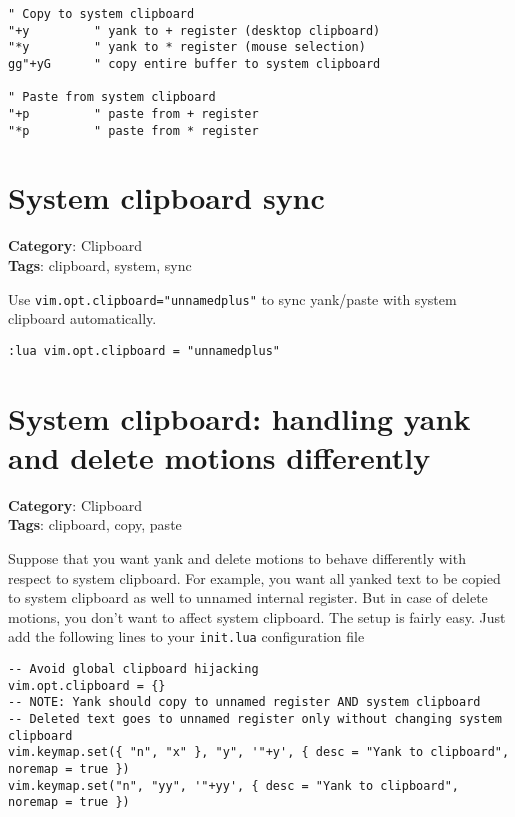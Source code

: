 {{{{\begin{Exa*}{}
\begin{Verbatim}[fontsize=\footnotesize, breaklines, breakanywhere]
" Copy to system clipboard
"+y         " yank to + register (desktop clipboard)
"*y         " yank to * register (mouse selection)
gg"+yG      " copy entire buffer to system clipboard

" Paste from system clipboard
"+p         " paste from + register
"*p         " paste from * register
\end{Verbatim}
\end{Exa*}

\section{System clipboard sync}

\textbf{Category}: Clipboard\\ \textbf{Tags}: clipboard, system, sync
\vspace{0.5cm}

Use {\footnotesize \Verb§vim.opt.clipboard="unnamedplus"§} to sync yank/paste with system clipboard automatically.

\begin{Exa*}{}
\begin{Verbatim}[fontsize=\footnotesize, breaklines, breakanywhere]
:lua vim.opt.clipboard = "unnamedplus"
\end{Verbatim}
\end{Exa*}

\section{System clipboard: handling yank and delete motions differently}

\textbf{Category}: Clipboard\\ \textbf{Tags}: clipboard, copy, paste
\vspace{0.5cm}

Suppose that you want yank and delete motions to behave differently with respect to system clipboard. For example, you want all yanked text to be copied to system clipboard as well to unnamed internal register. But in case of delete motions, you don't want to affect system clipboard. The setup is fairly easy. Just add the following lines to your {\footnotesize \Verb§init.lua§} configuration file

\begin{Exa*}{}
\begin{Verbatim}[fontsize=\footnotesize, breaklines, breakanywhere]
-- Avoid global clipboard hijacking
vim.opt.clipboard = {}
-- NOTE: Yank should copy to unnamed register AND system clipboard
-- Deleted text goes to unnamed register only without changing system clipboard
vim.keymap.set({ "n", "x" }, "y", '"+y', { desc = "Yank to clipboard", noremap = true })
vim.keymap.set("n", "yy", '"+yy', { desc = "Yank to clipboard", noremap = true })
\end{Verbatim}
\end{Exa*}

}}}}
